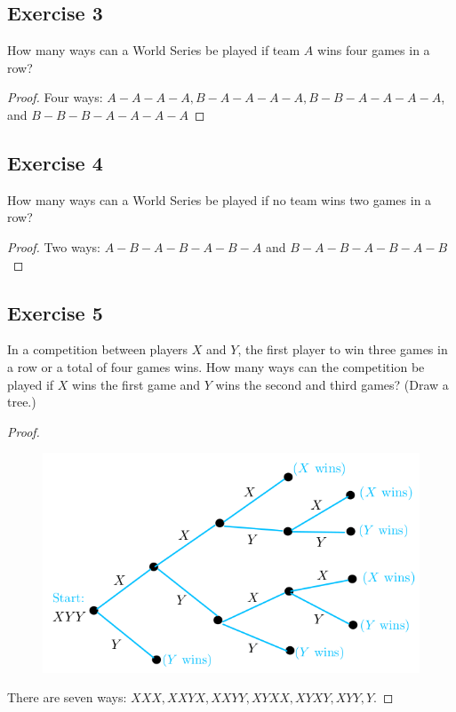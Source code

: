 \documentclass[14pt]{extarticle}
\begin{document}
\subsection{Exercise 3}
How many ways can a World Series be played if team $A$ wins four games in a row?

\begin{proof}
Four ways: \(A-A-A-A, B-A-A-A-A, B-B-A-A-A-A\), and \(B-B-B-A-A-A-A\)
\end{proof}

\subsection{Exercise 4}
How many ways can a World Series be played if no team wins two games in a row?

\begin{proof}
Two ways: \(A-B-A-B-A-B-A\) and \(B-A-B-A-B-A-B\)
\end{proof}

\subsection{Exercise 5}
In a competition between players $X$ and $Y$, the first player to win three games in a row or a total of four games 
wins. How many ways can the competition be played if $X$ wins the first game and $Y$ wins the second and third 
games? (Draw a tree.)

\begin{proof}
\begin{figure}[ht!]
\centering
\includegraphics[scale=0.31]{../images/9.2.5.png}
\end{figure}

There are seven ways: \(XXX, XXYX, XXYY, XYXX, XYXY, XYY, Y\).
\end{proof}
\end{document}
